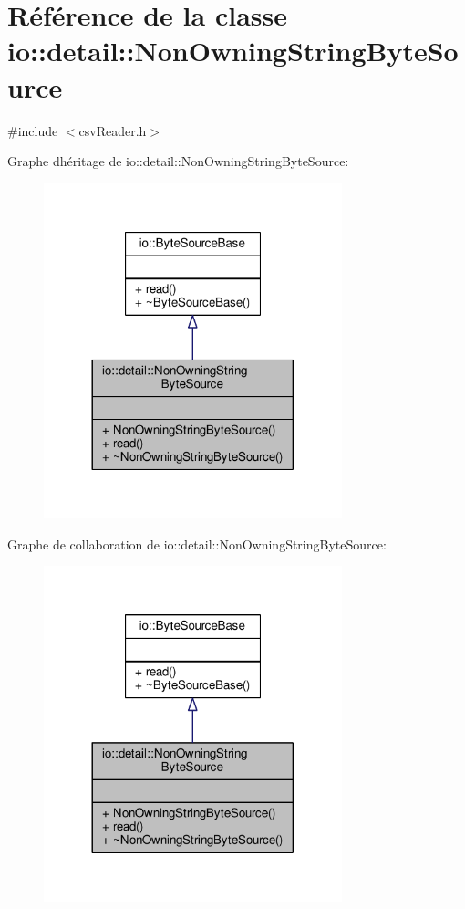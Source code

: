 \hypertarget{classio_1_1detail_1_1NonOwningStringByteSource}{}\section{Référence de la classe io\+:\+:detail\+:\+:Non\+Owning\+String\+Byte\+Source}
\label{classio_1_1detail_1_1NonOwningStringByteSource}


{\ttfamily \#include $<$csv\+Reader.\+h$>$}



Graphe d\textquotesingle{}héritage de io\+:\+:detail\+:\+:Non\+Owning\+String\+Byte\+Source\+:\nopagebreak
\begin{figure}[H]
\begin{center}
\leavevmode
\includegraphics[width=245pt]{classio_1_1detail_1_1NonOwningStringByteSource__inherit__graph}
\end{center}
\end{figure}


Graphe de collaboration de io\+:\+:detail\+:\+:Non\+Owning\+String\+Byte\+Source\+:\nopagebreak
\begin{figure}[H]
\begin{center}
\leavevmode
\includegraphics[width=245pt]{classio_1_1detail_1_1NonOwningStringByteSource__coll__graph}
\end{center}
\end{figure}
